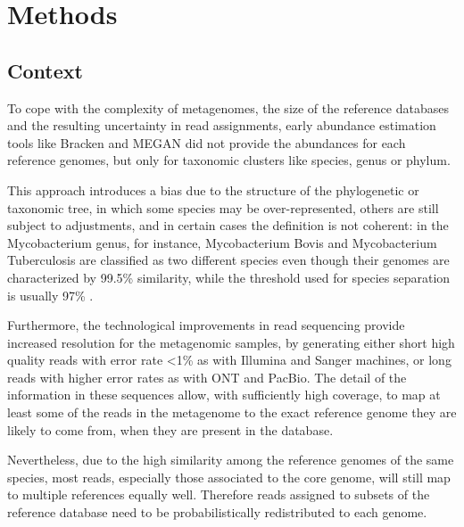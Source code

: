 
\chapter{Methods}
\label{Chapter3}

\section{Context}

To cope with the complexity of metagenomes, the size of the reference databases and the resulting uncertainty in read assignments, early abundance estimation tools like Bracken \cite{lu_bracken:_2017} and MEGAN \cite{huson_megan_2007} did not provide the abundances for each reference genomes, but only for taxonomic clusters like species, genus or phylum.

This approach introduces a bias due to the structure of the phylogenetic or taxonomic tree, in which some species may be over-represented, others are still subject to adjustments, and in certain cases the definition is not coherent: in the Mycobacterium genus, for instance, Mycobacterium Bovis and Mycobacterium Tuberculosis are classified as two different species even though their genomes are characterized by 99.5\% similarity, while the threshold used for species separation is usually 97\% \cite{garnier_complete_2003}.

Furthermore, the technological improvements in read sequencing provide increased resolution for the metagenomic samples, by generating either short high quality reads with error rate <1\% as with Illumina and Sanger machines, or long reads with higher error rates as with ONT and PacBio. The detail of the information in these sequences allow, with sufficiently high coverage, to map at least some of the reads in the metagenome to the exact reference genome they are likely to come from, when they are present in the database.

Nevertheless, due to the high similarity among the reference genomes of the same species, most reads, especially those associated to the core genome, will still map to multiple references equally well. Therefore reads assigned to subsets of the reference database need to be probabilistically redistributed to each genome.

